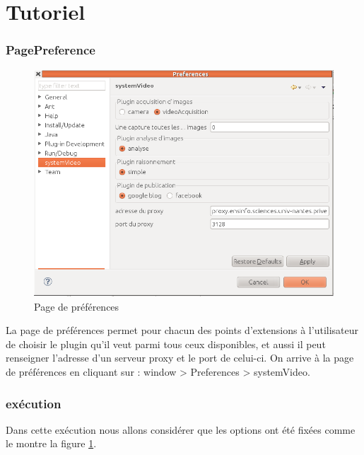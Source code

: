 \documentclass[a4paper , 12pt]{article}
\begin{document}
\part*{Tutoriel}
\section{PagePreference}
\begin{figure}
  \includegraphics[scale=0.45]{images/preference.png}
  \caption{Page de préférences}
  \label{fig:preferences}
\end{figure}
La page de préférences permet pour chacun des points d'extensions à l'utilisateur de choisir le plugin qu'il veut parmi tous ceux disponibles, et aussi il peut renseigner l'adresse d'un serveur proxy et le port de celui-ci.
On arrive à la page de préférences en cliquant sur : window > Preferences > systemVideo.

\section{exécution}
Dans cette exécution nous allons considérer que les options ont été fixées comme le montre la figure \ref{fig:preferences}.
\end{document}
